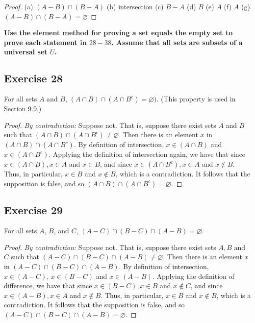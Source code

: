 \documentclass[14pt]{extarticle}
\newcommand{\es}{\varnothing}
\newcommand{\cy}{\color{cyan}}
\begin{document}
\begin{proof}
  (a) \((A - B) \cap (B - A)\) (b) intersection (c) $B - A$ (d) $B$ (e) $A$ (f) $A$ (g) \((A - B) \cap (B - A) = \es\)
\end{proof}

{\bf \cy Use the element method for proving a set equals the empty set to prove each statement in $28-38$. Assume that all sets are subsets of a universal set $U$.}

\subsection{Exercise 28}
For all sets $A$ and $B$, \((A \cap B) \cap (A \cap B^c) = \es)\). (This property is used in Section 9.9.)

\begin{proof}
  {\it By contradiction:} Suppose not. That is, suppose there exist sets $A$ and $B$ such that \((A \cap B) \cap (A
  \cap B^c) \neq \es\). Then there is an element $x$ in \((A \cap B) \cap (A \cap B^c)\). By definition of intersection,
  \(x \in (A \cap B)\) and \(x \in (A \cap B^c)\). Applying the definition of intersection again, we have that since
  \(x \in (A \cap B), x \in A\) and \(x \in B\), and since \(x \in (A \cap B^c), x \in A\) and \(x \notin B\). Thus, in
  particular, \(x \in B\) and \(x \notin B\), which is a contradiction. It follows that the supposition is false,
  and so \((A \cap B) \cap (A \cap B^c) = \es\).
\end{proof}

\subsection{Exercise 29}
For all sets $A$, $B$, and $C$, \((A - C) \cap (B - C) \cap (A - B) = \es\).

\begin{proof}
  {\it By contradiction:} Suppose not. That is, suppose there exist sets $A, B$ and $C$ such that \((A - C) \cap (B - C)
  \cap (A - B) \neq \es\). Then there is an element $x$ in \((A - C) \cap (B - C) \cap (A - B)\). By definition of
  intersection, \(x \in (A - C)\), \(x \in (B - C)\) and \(x \in (A - B)\). Applying the definition of difference, we
  have that since \(x \in (B - C), x \in B\) and \(x \notin C\), and since \(x \in (A - B), x \in A\) and \(x \notin
  B\). Thus, in particular, \(x \in B\) and \(x \notin B\), which is a contradiction. It follows that the supposition
  is false, and so \((A - C) \cap (B - C) \cap (A - B) = \es\).
\end{proof}
\end{document}
